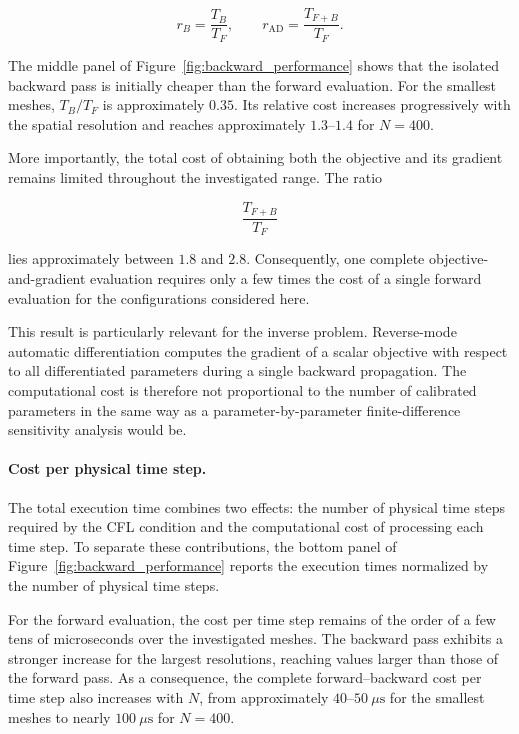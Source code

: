\documentclass[11pt,a4paper]{report}
\theoremstyle{plain}
\theoremstyle{definition}
\begin{document}
\begin{equation}
    r_B
    =
    \frac{T_B}{T_F},
    \qquad
    r_{\mathrm{AD}}
    =
    \frac{T_{F+B}}{T_F}.
\end{equation}

The middle panel of Figure~\ref{fig:backward_performance} shows that the
isolated backward pass is initially cheaper than the forward evaluation. For
the smallest meshes, $T_B/T_F$ is approximately $0.35$. Its relative cost
increases progressively with the spatial resolution and reaches approximately
$1.3$--$1.4$ for $N=400$.

More importantly, the total cost of obtaining both the objective and its
gradient remains limited throughout the investigated range. The ratio

\begin{equation}
    \frac{T_{F+B}}{T_F}
\end{equation}

lies approximately between $1.8$ and $2.8$. Consequently, one complete
objective-and-gradient evaluation requires only a few times the cost of a
single forward evaluation for the configurations considered here.

This result is particularly relevant for the inverse problem. Reverse-mode
automatic differentiation computes the gradient of a scalar objective with
respect to all differentiated parameters during a single backward
propagation. The computational cost is therefore not proportional to the
number of calibrated parameters in the same way as a parameter-by-parameter
finite-difference sensitivity analysis would be.

\paragraph{Cost per physical time step.}

The total execution time combines two effects: the number of physical time
steps required by the CFL condition and the computational cost of processing
each time step. To separate these contributions, the bottom panel of
Figure~\ref{fig:backward_performance} reports the execution times normalized
by the number of physical time steps.

For the forward evaluation, the cost per time step remains of the order of a
few tens of microseconds over the investigated meshes. The backward pass
exhibits a stronger increase for the largest resolutions, reaching values
larger than those of the forward pass. As a consequence, the complete
forward--backward cost per time step also increases with $N$, from
approximately $40$--$50~\mu\mathrm{s}$ for the smallest meshes to nearly
$100~\mu\mathrm{s}$ for $N=400$.
\end{document}
